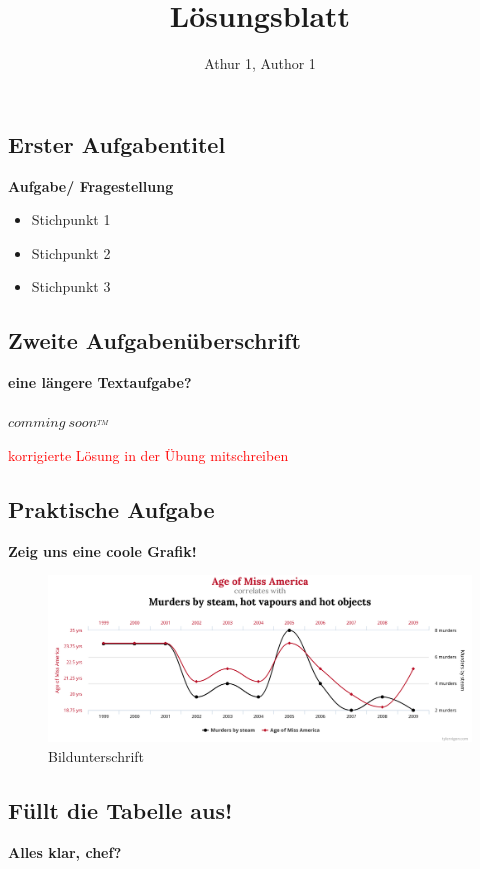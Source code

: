 \documentclass[a4paper,12pt]{article}
\author{Athur 1, Author 1}
\title{ \textbf{L\"osungsblatt \thesection}}
\begin{document}
	 
	\maketitle	 %
	
	\subsection{Erster Aufgabentitel}
	\textbf{Aufgabe/ Fragestellung}
	
	\begin{itemize}
		\item Stichpunkt 1
		\item Stichpunkt 2
		\item Stichpunkt 3
	\end{itemize}
	
	\subsection{Zweite Aufgaben\"uberschrift}
	\textbf{eine l\"angere Textaufgabe?}\\
	\\
	\textit{$comming~ soon^{_{TM}}$}
	\\
	\par
	\textcolor{red}{korrigierte Lösung in der \"Ubung mitschreiben}

	
	
	\subsection{Praktische Aufgabe}
	\textbf{Zeig uns eine coole Grafik!}
	
	\begin{figure}[h!]
		\includegraphics[width=0.85\linewidth]{chart.png}
		\caption{Bildunterschrift}
	\end{figure}
	
	
	\subsection{F\"ullt die Tabelle aus!}
	\textbf{Alles klar, chef?}
	
\end{document}
